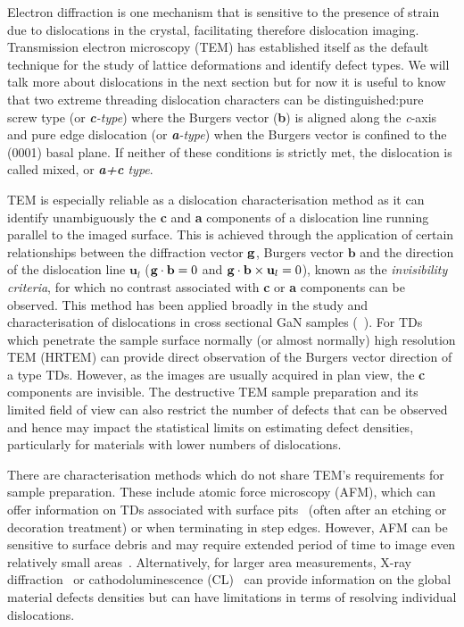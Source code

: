 Electron diffraction is one mechanism that is sensitive to the presence of strain due to dislocations in the crystal, facilitating therefore dislocation imaging. Transmission electron microscopy (TEM) has established itself as the default technique for the study of lattice
deformations and identify defect types. We will talk more about dislocations in the next section but for now it is useful to know that two extreme \hkl[0001] threading dislocation characters can be distinguished:pure screw type (or \textit{\textbf{c}-type}) where the Burgers vector (\textbf{b}) is aligned along the \textit{c}-axis and pure edge dislocation (or \textit{\textbf{a}-type}) when the Burgers vector is confined to the (0001) basal plane. If neither of these conditions is strictly met, the dislocation is called mixed, or \textit{\textbf{a+c} type}.



TEM is especially reliable as a dislocation characterisation method as it can identify unambiguously the \textbf{c} and \textbf{a} components of a dislocation line running parallel to the imaged surface. This is achieved through the application of certain relationships between the diffraction vector $\vb{g}$, Burgers vector $\mathbf{b}$ and the direction of the dislocation line $\mathbf{u}_l$ ($\vb{g} \cdot \vb{b} = 0$ and $\vb{g} \cdot \vb{b} \times \vb{ u}_l = 0$), known as the \textit{invisibility criteria}, for which no contrast associated
with \textbf{c} or \textbf{a} components can be observed. This method has been applied broadly in the study and
characterisation of dislocations in cross sectional GaN samples (\eg~\cite{Hino00}). For TDs which penetrate the sample surface normally (or almost normally) high resolution TEM (HRTEM) can provide direct observation of the Burgers vector direction of a type TDs. However, as the images are usually acquired in plan view, the \textbf{c} components are invisible. The destructive TEM sample preparation and its limited field of view can also restrict the number of defects that can be observed and hence may impact the statistical limits on estimating defect densities, particularly for materials with lower numbers of dislocations.


There are characterisation methods which do not share TEM’s requirements for sample preparation. These
include atomic force microscopy (AFM), which can offer information on TDs associated with surface pits~\cite{Craven02} (often after an etching or decoration treatment) or when terminating in step edges. However, AFM can be sensitive to surface debris and may require extended period of time to image even relatively small areas~\cite{Koinkar97}. Alternatively, for larger area measurements, X-ray diffraction~\cite{Heinke00} or cathodoluminescence (CL)~\cite{Rosner97} can provide information on the global material defects densities but can have limitations in terms of resolving individual dislocations. 

